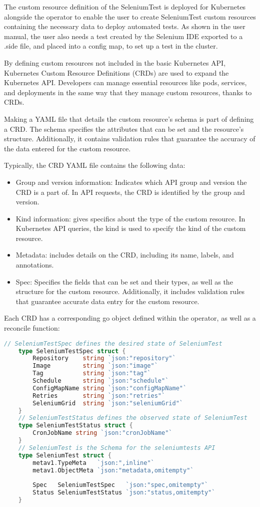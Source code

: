 The custom resource definition of the SeleniumTest is deployed for Kubernetes alongside the operator to enable the user to create SeleniumTest custom resources containing the necessary data to deploy automated tests. As shown in the user manual, the user also needs a test created by the Selenium IDE exported to a .side file, and placed into a config map, to set up a test in the cluster.

By defining custom resources not included in the basic Kubernetes API, Kubernetes Custom Resource Definitions (CRDs) are used to expand the Kubernetes API. Developers can manage essential resources like pods, services, and deployments in the same way that they manage custom resources, thanks to CRDs.

Making a YAML file that details the custom resource's schema is part of defining a CRD. The schema specifies the attributes that can be set and the resource's structure. Additionally, it contains validation rules that guarantee the accuracy of the data entered for the custom resource.

Typically, the CRD YAML file contains the following data:

\begin{itemize}
	\item Group and version information: Indicates which API group and version the CRD is a part of. In API requests, the CRD is identified by the group and version.
	\item Kind information: gives specifics about the type of the custom resource. In Kubernetes API queries, the kind is used to specify the kind of the custom resource.
	\item Metadata: includes details on the CRD, including its name, labels, and annotations.
	\item Spec: Specifies the fields that can be set and their types, as well as the structure for the custom resource. Additionally, it includes validation rules that guarantee accurate data entry for the custom resource.
\end{itemize}

Each CRD has a corresponding go object defined within the operator, as well as a reconcile function:
\begin{lstlisting}[language={Go}]
	// SeleniumTestSpec defines the desired state of SeleniumTest
	type SeleniumTestSpec struct {
		Repository    string `json:"repository"`
		Image         string `json:"image"`
		Tag           string `json:"tag"`
		Schedule      string `json:"schedule"`
		ConfigMapName string `json:"configMapName"`
		Retries       string `json:"retries"`
		SeleniumGrid  string `json:"seleniumGrid"`
	}
	// SeleniumTestStatus defines the observed state of SeleniumTest
	type SeleniumTestStatus struct {
		CronJobName string `json:"cronJobName"`
	}
	// SeleniumTest is the Schema for the seleniumtests API
	type SeleniumTest struct {
		metav1.TypeMeta   `json:",inline"`
		metav1.ObjectMeta `json:"metadata,omitempty"`
	
		Spec   SeleniumTestSpec   `json:"spec,omitempty"`
		Status SeleniumTestStatus `json:"status,omitempty"`
	}
\end{lstlisting}

